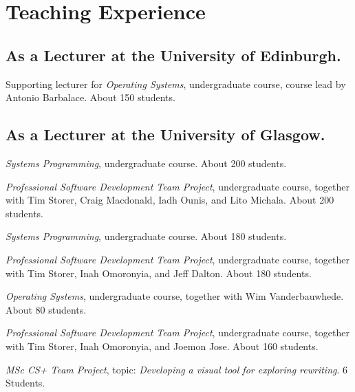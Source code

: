 \section{Teaching Experience}

\subsection{\footnotesize As a Lecturer at the University of Edinburgh.}

\begin{cvitemize}[\small 2020 - 2021]
    \item Supporting lecturer for \emph{Operating Systems}, undergraduate course, course lead by Antonio Barbalace. About 150 students.
\end{cvitemize}

\subsection{\footnotesize As a Lecturer at the University of Glasgow.}

\begin{cvitemize}[\small 2019 - 2020]
    \item \emph{Systems Programming}, undergraduate course. About 200 students.
    \item \emph{Professional Software Development Team Project}, undergraduate course, together with  Tim Storer, Craig Macdonald, Iadh Ounis, and Lito Michala. About 200 students.
\end{cvitemize}

\begin{cvitemize}[\small 2018 - 2019]
    \item \emph{Systems Programming}, undergraduate course. About 180 students.
    \item \emph{Professional Software Development Team Project}, undergraduate course, together with  Tim Storer, Inah Omoronyia, and Jeff Dalton. About 180 students.
\end{cvitemize}

\begin{cvitemize}[\small 2017 - 2018]
    \item \emph{Operating Systems}, undergraduate course, together with Wim Vanderbauwhede. About 80 students.
    \item \emph{Professional Software Development Team Project}, undergraduate course, together with  Tim Storer, Inah Omoronyia, and Joemon Jose. About 160 students.
    \item \emph{MSc CS+ Team Project}, topic: \emph{Developing a visual tool for exploring rewriting}. 6 Students.
\end{cvitemize}

